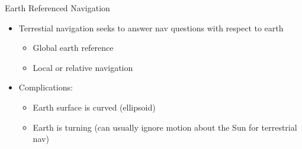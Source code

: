 \begin{frame}
Earth Referenced Navigation
 \begin{itemize}
 \item Terrestial navigation seeks to answer nav questions with respect to earth
 \begin{itemize}
   \item Global earth reference
   \item Local or relative navigation
 \end{itemize}
 \item Complications:
 \begin{itemize}
   \item Earth surface is curved (ellipsoid)
   \item Earth is turning (can usually ignore motion about the Sun for terrestrial nav)
 \end{itemize}
\end{itemize}
\end{frame}
